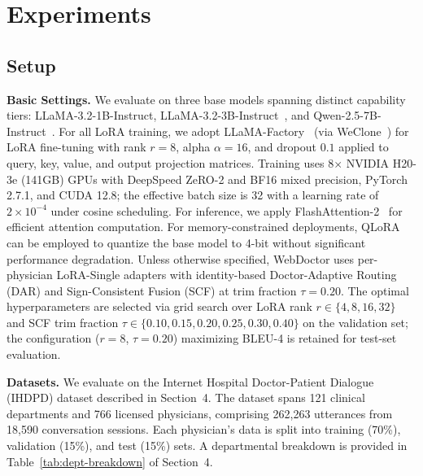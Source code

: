 ﻿\section*{Experiments}\label{section:evaluation}

\subsection*{Setup}


\textbf{Basic Settings.} We evaluate on three base models spanning distinct capability tiers: LLaMA-3.2-1B-Instruct, LLaMA-3.2-3B-Instruct~\cite{grattafioriLlama3Herd2024}, and Qwen-2.5-7B-Instruct~\cite{qwenQwen25TechnicalReport2025}. For all LoRA training, we adopt LLaMA-Factory~\cite{zheng2024llamafactory} (via WeClone~\cite{xmingXming521WeClone2026}) for LoRA fine-tuning with rank $r=8$, alpha $\alpha=16$, and dropout $0.1$ applied to query, key, value, and output projection matrices. Training uses 8$\times$ NVIDIA H20-3e (141GB) GPUs with DeepSpeed ZeRO-2 and BF16 mixed precision, PyTorch 2.7.1, and CUDA 12.8; the effective batch size is 32 with a learning rate of $2\times10^{-4}$ under cosine scheduling. For inference, we apply FlashAttention-2~\cite{dao2023flashattention} for efficient attention computation. For memory-constrained deployments, QLoRA~\cite{dettmers2023qlora} can be employed to quantize the base model to 4-bit without significant performance degradation. Unless otherwise specified, WebDoctor uses per-physician LoRA-Single adapters with identity-based Doctor-Adaptive Routing (DAR) and Sign-Consistent Fusion (SCF) at trim fraction $\tau=0.20$. The optimal hyperparameters are selected via grid search over LoRA rank $r \in \{4,8,16,32\}$ and SCF trim fraction $\tau \in \{0.10,0.15,0.20,0.25,0.30,0.40\}$ on the validation set; the configuration ($r=8$, $\tau=0.20$) maximizing BLEU-4 is retained for test-set evaluation. 

\textbf{Datasets.} We evaluate on the Internet Hospital Doctor-Patient Dialogue (IHDPD) dataset described in Section~4. The dataset spans 121 clinical departments and 766 licensed physicians, comprising 262,263 utterances from 18,590 conversation sessions. Each physician's data is split into training (70\%), validation (15\%), and test (15\%) sets. A departmental breakdown is provided in Table~\ref{tab:dept-breakdown} of Section~4.

